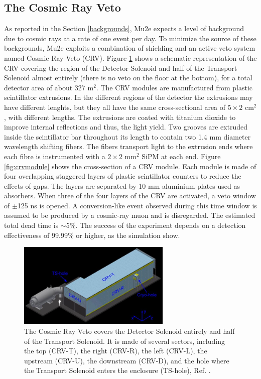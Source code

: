 \subsection{The Cosmic Ray Veto}\label{CRV}
As reported in the Section \ref{backgrounds}, Mu2e expects a level of background due to cosmic rays at a rate of one event per day. 
To minimize the source of these backgrounds, Mu2e exploits a combination of shielding and an active 
veto system named Cosmic Ray Veto (CRV). Figure \ref{fig:crv} shows a schematic representation of 
the CRV covering the region of the Detector Solenoid and half of the Transport Solenoid 
almost entirely (there is no veto on the floor at the bottom), for a total detector area of about 327 m$^2$.
The CRV modules are manufactured from plastic scintillator extrusions. 
In the different regions of the detector the extrusions may have different lenghts, 
but they all have the same cross-sectional area of $5 \times 2$ cm$^2$, with different lengths. The extrusions 
are coated with titanium dioxide to improve internal reflections and thus, the light yield. 
Two grooves are extruded inside the scintillator bar throughout its length to contain two 
1.4 mm diameter wavelength shifting fibers. The fibers transport light to the extrusion 
ends where each fibre is instrumented with a $2 \times 2$ mm$^2$ SiPM at each end. Figure \ref{fig:crvmodule} 
shows the cross-section of a CRV module. Each module is made of four overlapping staggered layers 
of plastic scintillator counters to reduce the effects of gaps. The layers are separated by 10 mm aluminium plates used as absorbers. 
When three of the four layers of the CRV are activated, a veto window of $\pm$125 ns is opened. 
A conversion-like event observed during this time window is assumed to be produced by a cosmic-ray muon and is disregarded. 
The estimated total dead time is $\sim$5\%. 
The success of the experiment depends on a detection effectiveness of 99.99\% or higher, as the simulation show.

\begin{figure}[!h]
\centering
\includegraphics[width =0.65\textwidth]{figures/jpg/Crv_downstream.jpg}
\caption{The Cosmic Ray Veto covers the Detector Solenoid entirely and half 
of the Transport Solenoid. It is made of several sectors, including the top 
(CRV-T), the right (CRV-R), the left (CRV-L), the upstream (CRV-U), the downstream 
(CRV-D), and the hole where the Transport Solenoid enters the enclosure (TS-hole), Ref. \cite{bartoszek2015mu2e}.}
\label{fig:crv}
\end{figure}

